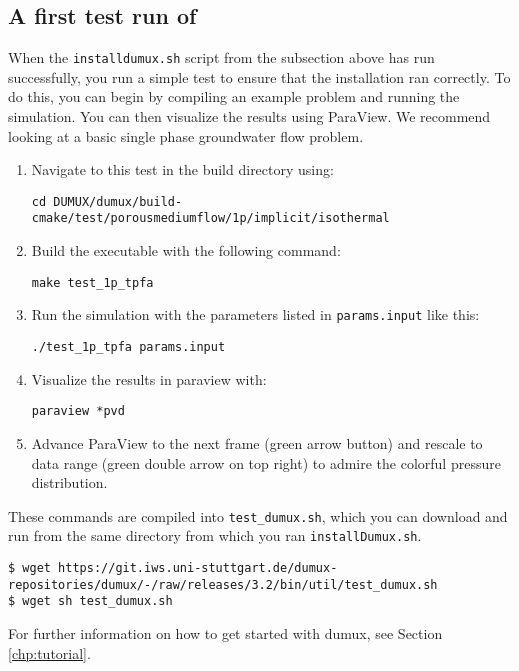 \subsection{A first test run of \Dumux}
When the \texttt{installdumux.sh} script from the subsection above has run successfully,
you run a simple test to ensure that the installation ran correctly. To do this, you can
begin by compiling an example problem and running the simulation. You can then visualize
the results using ParaView. We recommend looking at a basic single phase groundwater flow problem.
\begin{enumerate}
\item Navigate to this test in the build directory using:
\begin{lstlisting}[style=Bash]
cd DUMUX/dumux/build-cmake/test/porousmediumflow/1p/implicit/isothermal
\end{lstlisting}
\item Build the executable with the following command:
\begin{lstlisting}[style=Bash]
make test_1p_tpfa
\end{lstlisting}
\item Run the simulation with the parameters listed in \texttt{params.input} like this:
\begin{lstlisting}[style=Bash]
./test_1p_tpfa params.input
\end{lstlisting}
\item Visualize the results in paraview with:
\begin{lstlisting}[style=Bash]
paraview *pvd
\end{lstlisting}
\item Advance ParaView to the next frame (green arrow button) and rescale to data range
(green double arrow on top right) to admire the colorful pressure distribution.
\end{enumerate}

These commands are compiled into \texttt{test\_dumux.sh}, which you can download and run
from the same directory from which you ran \texttt{installDumux.sh}.

\begin{lstlisting}[style=Bash]
$ wget https://git.iws.uni-stuttgart.de/dumux-repositories/dumux/-/raw/releases/3.2/bin/util/test_dumux.sh
$ wget sh test_dumux.sh
\end{lstlisting}

For further information on how to get started with dumux, see Section \ref{chp:tutorial}.
